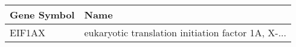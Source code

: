 \begin{tabular}{ll}
\toprule
Gene Symbol &                                               Name \\
\midrule
     EIF1AX & eukaryotic translation initiation factor 1A, X-... \\
\bottomrule
\end{tabular}
